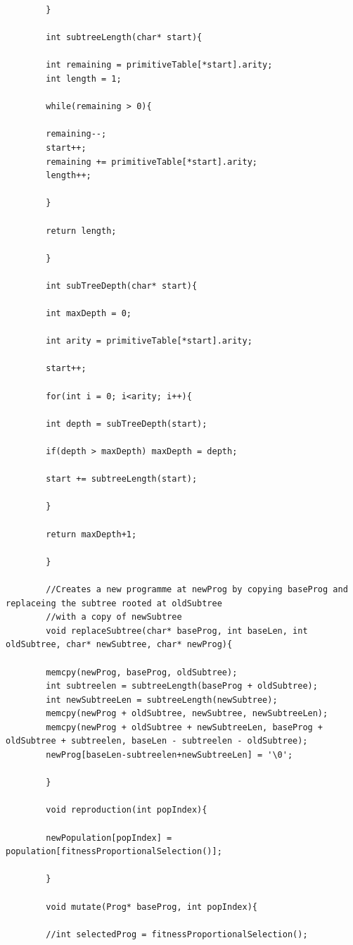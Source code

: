 \documentclass{article}
\begin{document}
\begin{lstlisting}
	    }
	    
	    int subtreeLength(char* start){
	    
	    int remaining = primitiveTable[*start].arity;
	    int length = 1;
	    
	    while(remaining > 0){
	    
	    remaining--;
	    start++;
	    remaining += primitiveTable[*start].arity;
	    length++;
	    
	    }
	    
	    return length;
	    
	    }
	    
	    int subTreeDepth(char* start){
	    
	    int maxDepth = 0;
	    
	    int arity = primitiveTable[*start].arity;
	    
	    start++;
	    
	    for(int i = 0; i<arity; i++){
	    
	    int depth = subTreeDepth(start);
	    
	    if(depth > maxDepth) maxDepth = depth;
	    
	    start += subtreeLength(start);
	    
	    }
	    
	    return maxDepth+1;
	    
	    }
	    
	    //Creates a new programme at newProg by copying baseProg and replaceing the subtree rooted at oldSubtree
	    //with a copy of newSubtree
	    void replaceSubtree(char* baseProg, int baseLen, int oldSubtree, char* newSubtree, char* newProg){
	    
	    memcpy(newProg, baseProg, oldSubtree);
	    int subtreelen = subtreeLength(baseProg + oldSubtree);
	    int newSubtreeLen = subtreeLength(newSubtree);
	    memcpy(newProg + oldSubtree, newSubtree, newSubtreeLen);
	    memcpy(newProg + oldSubtree + newSubtreeLen, baseProg + oldSubtree + subtreelen, baseLen - subtreelen - oldSubtree);
	    newProg[baseLen-subtreelen+newSubtreeLen] = '\0';
	    
	    }
	    
	    void reproduction(int popIndex){
	    
	    newPopulation[popIndex] = population[fitnessProportionalSelection()];
	    
	    }
	    
	    void mutate(Prog* baseProg, int popIndex){
	    
	    //int selectedProg = fitnessProportionalSelection();
	    

\end{lstlisting}
\end{document}
